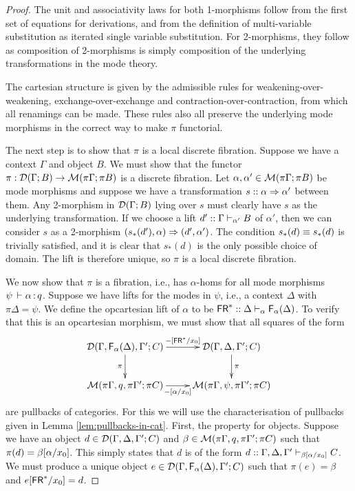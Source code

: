 \begin{proof}
The unit and associativity laws for both 1-morphisms follow from the first set of equations for derivations, and from the definition of multi-variable substitution as iterated single variable substitution. For 2-morphisms, they follow as composition of 2-morphisms is simply composition of the underlying transformations in the mode theory.

The cartesian structure is given by the admissible rules for weakening-over-weakening, exchange-over-exchange and contraction-over-contraction, from which all renamings can be made. These rules also all preserve the underlying mode morphisms in the correct way to make $\pi$ functorial.

The next step is to show that $\pi$ is a local discrete fibration. Suppose we have a context $\Gamma$ and object $B$. We must show that the functor $\pi : \mathcal{D}(\Gamma; B) \to \mathcal{M}(\pi \Gamma; \pi B)$ is a discrete fibration. Let $\alpha, \alpha' \in \mathcal{M}(\pi \Gamma; \pi B)$ be mode morphisms and suppose we have a transformation $s :: \alpha \Rightarrow \alpha'$ between them. Any 2-morphism in $\mathcal{D}(\Gamma; B)$ lying over $s$ must clearly have $s$ as the underlying transformation. If we choose a lift $d' :: \Gamma \vdash_{\alpha'} B$ of $\alpha'$, then we can consider $s$ as a 2-morphism $(s_*(d'), \alpha) \Rightarrow (d', \alpha')$. The condition $s_*(d) \equiv s_*(d)$ is trivially satisfied, and it is clear that $s_*(d)$ is the only possible choice of domain. The lift is therefore unique, so $\pi$ is a local discrete fibration.

We now show that $\pi$ is a fibration, i.e., has $\alpha$-homs for all mode morphisms $\psi \, \vdash \alpha \, \mathit{:} \, q$. Suppose we have lifts for the modes in $\psi$, i.e., a context $\Delta$ with $\pi\Delta = \psi$. We define the opcartesian lift of $\alpha$ to be $\mathsf{FR}^* :: \Delta \vdash_{\alpha} \mathsf{F}_{\alpha}(\Delta)$. To verify that this is an opcartesian morphism, we must show that all squares of the form
\[ \xymatrix{
    \cD(\Gamma,\F{\alpha}{\Delta},\Gamma';C) \ar[r]^-{\Cut{-}{\FR^*}{x_0}} \ar[d]_\pi &
    \cD(\Gamma,\Delta,\Gamma';C) \ar[d]^\pi \\
    \M(\pi \Gamma, q, \pi \Gamma'; \pi C) \ar[r]_-{\Cut{-}{\alpha}{x_0}} &
    \M(\pi\Gamma,\psi,\pi\Gamma'; \pi C)
}\]
are pullbacks of categories. For this we will use the characterisation of pullbacks given in Lemma \ref{lem:pullbacks-in-cat}. First, the property for objects. Suppose we have an object $d \in \mathcal{D}(\Gamma,\Delta,\Gamma';C)$ and $\beta \in \mathcal{M}(\pi \Gamma, q,\pi \Gamma'; \pi C)$ such that $\pi(d) = \beta[\alpha/x_0]$. This simply states that $d$ is of the form $d :: \Gamma, \Delta, \Gamma' \vdash_{\beta[\alpha/x_0]} C$. We must produce a unique object $e \in \mathcal{D}(\Gamma,\mathsf{F}_{\alpha}(\Delta),\Gamma';C)$ such that $\pi(e) = \beta$ and $e[\mathsf{FR}^*/x_0] = d$.


\end{proof}
